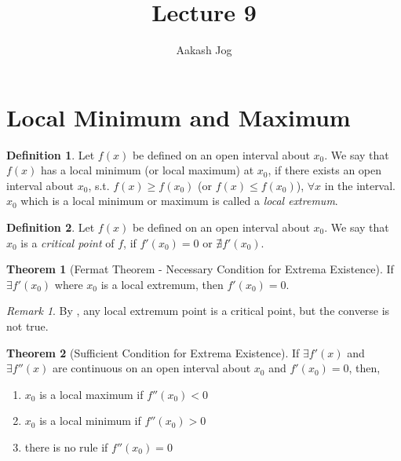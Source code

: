 \documentclass[fleqn]{article}
\title{Lecture 9}
\author{Aakash Jog}
\date{\formatdate{23}{11}{2014}}
\theoremstyle{definition}
\newtheorem{definition}{Definition}
\theoremstyle{theorem}
\newtheorem{theorem}{Theorem}
\theoremstyle{remark}
\newtheorem{remark}{Remark}
\begin{document}
	
\maketitle

\tableofcontents

\newpage

\section{Local Minimum and Maximum}

\begin{definition}
	Let $f(x)$ be defined on an open interval about $x_0$. We say that $f(x)$ has a local minimum (or local maximum) at $x_0$, if there exists an open interval about $x_0$, s.t. $f(x) \geq f(x_0)$ (or $f(x) \leq f(x_0)$), $\forall x$ in the interval. $x_0$ which is a local minimum or maximum is called a \emph{local extremum}.
\end{definition}

\begin{definition}
	Let $f(x)$ be defined on an open interval about $x_0$. We say that $x_0$ is a \emph{critical point} of $f$, if $f'(x_0) = 0$ or $\nexists f'(x_0)$.
\end{definition}

\begin{theorem}[Fermat Theorem - Necessary Condition for Extrema Existence]\label{Fermat Theorem}
	If $\exists f'(x_0)$ where $x_0$ is a local extremum, then $f'(x_0) = 0$.
\end{theorem}

\begin{remark}
	By , any local extremum point is a critical point, but the converse is not true.
\end{remark}

\begin{theorem}[Sufficient Condition for Extrema Existence] \label{sufficient condition for extrema existence}
	If $\exists f'(x)$ and $\exists f''(x)$ are continuous on an open interval about $x_0$ and $f'(x_0) = 0$, then, 
	\begin{enumerate}
		\item $x_0$ is a local maximum if $f''(x_0) < 0$
		\item $x_0$ is a local minimum if $f''(x_0) > 0$
		\item there is no rule if $f''(x_0) = 0$
	\end{enumerate}
\end{theorem}
\end{document}
